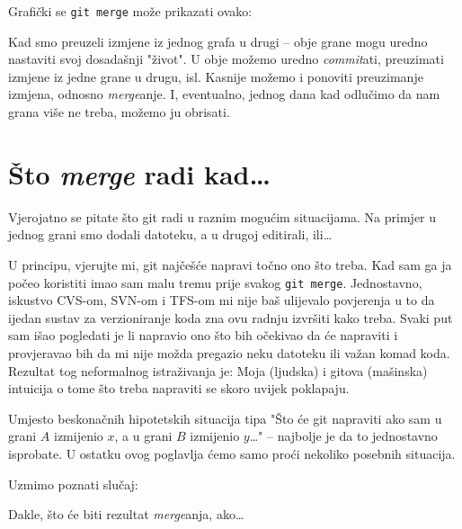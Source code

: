 Grafički se \verb+git merge+ može prikazati ovako:



Kad smo preuzeli izmjene iz jednog grafa u drugi -- obje grane mogu uredno nastaviti svoj dosadašnji "život".
U obje možemo uredno \emph{commit}ati, preuzimati izmjene iz jedne grane u drugu, isl.
Kasnije možemo i ponoviti preuzimanje izmjena, odnosno \emph{merge}anje.
I, eventualno, jednog dana kad odlučimo da nam grana više ne treba, možemo ju obrisati.





\section*{Što \emph{merge} radi kad\dots}

Vjerojatno se pitate što git radi u raznim mogućim situacijama. Na primjer u jednog grani smo dodali datoteku, a u drugoj editirali, ili\dots

U principu, vjerujte mi, git najčešće napravi točno ono što treba. 
Kad sam ga ja počeo koristiti imao sam malu tremu prije svakog \verb+git merge+.
Jednostavno, iskustvo CVS-om, SVN-om i TFS-om mi nije baš ulijevalo povjerenja u to da ijedan sustav za verzioniranje koda zna ovu radnju izvršiti kako treba.
Svaki put sam išao pogledati je li napravio ono što bih očekivao da će napraviti i provjeravao bih da mi nije možda pregazio neku datoteku ili važan komad koda.
Rezultat tog neformalnog istraživanja je: Moja (ljudska) i gitova (mašinska) intuicija o tome što treba napraviti se skoro uvijek poklapaju.

Umjesto beskonačnih hipotetskih situacija tipa "Što će git napraviti ako sam u grani $A$ izmijenio $x$, a u grani $B$ izmijenio $y$\dots" -- najbolje je da to jednostavno isprobate. 
U ostatku ovog poglavlja ćemo samo proći nekoliko posebnih situacija.

Uzmimo poznati slučaj:



Dakle, što će biti rezultat \emph{merge}anja, ako\dots

